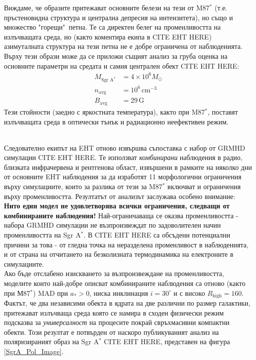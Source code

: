\begin{minipage}{22em}
Виждаме, че образите притежават основните белези на тези от M87$^*$ (т.е. пръстеновидна структура и централна депресия на интензитета), но също и множество "горещи"$\,$ петна. Те са директен белег на променливостта на излъчващата среда, но (както коментира екипа в CITE EHT HERE) азимуталната структура на тези петна не е добре ограничена от наблюденията. Върху тези образи може да се приложи същият анализ за груба оценка на основните параметри на средата и самия централен обект CITE EHT HERE:
\begin{equation}
	\begin{aligned}
	M_{\text{Sgr A}^*} &= 4\times 10^6 M_\odot\\
	n_{\text{avg}} &= 10^6\, \text{cm}^{-3}\\
	B_{\text{avg}} &= 29\, \text{G}
	\end{aligned}
\end{equation}
Тези стойности (заедно с яркостната температура), както при M87$^*$, поставят излъчващата среда в оптически тънък и радиационно неефективен режим.
\end{minipage}\\

\noindent Следователно екипът на EHT отново извършва съпоставка с набор от GRMHD симулации CITE EHT HERE. Те използват \emph{комбинирани} наблюдения в радио, близката инфрачервена и рентгенова област, извършени в рамките на няколко дни от основните EHT наблюдения за да изработят 11 морфологични ограничения върху симулациите, които за разлика от тези за M87$^*$ включват и ограничения върху променливостта. Резултатът от анализът заслужава особено внимание:\\

\noindent\textbf{Нито един модел не удовлетворява всички ограничения, следващи от комбинираните наблюдения!} Най-ограничаваща се оказва променливостта - набора GRMHD симулации не възпроизвеждат по задоволителен начин променливостта на Sgr A$^*$. В CITE EHT HERE са обсъдени потенциални причини за това - от гледна точка на неразделена променливост в наблюденията, и от страна на отчитането на безколизната термодинамика на електроните в симулациите.\\\newline
Ако бъде отслабено изискването за възпроизвеждане на променливостта, моделите които най-добре описват комбинираните наблюдения са отново (както при М87$^*$) MAD при $a_*>0$, ниска инклинация $i = 30^\circ$ и с високо $R_\text{high} = 160$. Фактът, че два независими обекта в ядрата на две различни по размер галактики, притежават излъчваща среда която се намира в сходен физически режим подсказва за \emph{универсалност} на процесите покрай свръхмасивни компактни обекти. Този резултат е потвърден от наскоро публикуваният анализ на поляризираният образ на Sgr A$^*$ CITE EHT HERE, представен на фигура \ref{SgrA_Pol_Image}.\\

